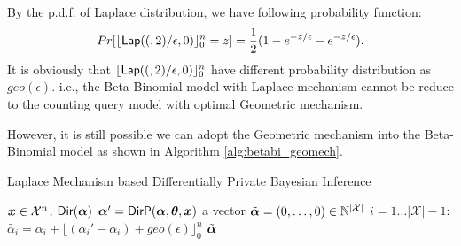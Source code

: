 \documentclass{article}
\begin{document}
By the p.d.f. of Laplace distribution, we have following probability function:
\[
	Pr[\lfloor \mathsf{Lap}((, 2)/\epsilon, 0) \rfloor_0^{n} = z]
	= \frac{1}{2}(1 - e^{-z/\epsilon} - e^{-z/\epsilon}).
\]
It is obviously that $\lfloor \mathsf{Lap}((, 2)/\epsilon, 0) \rfloor_0^{n}$ have different probability distribution as $geo(\epsilon)$.
i.e., the Beta-Binomial model with Laplace mechanism cannot be reduce to the counting query model with optimal Geometric mechanism.

However, it is still possible we can adopt the Geometric mechanism into the Beta-Binomial model as shown in Algorithm \ref{alg:betabi_geomech}.

\begin{algorithm}
  \caption{Laplace Mechanism based Differentially Private Bayesian Inference}
  \label{alg:betabi_geomech}
  \begin{algorithmic}
  \STATE $\boldsymbol{x}\in\mathcal{X}^n$, $\mathsf{Dir}(\boldsymbol{\alpha})$
  \STATE {} $\boldsymbol{\alpha}' = \mathsf{DirP}(\boldsymbol{\alpha},\boldsymbol{\theta},\boldsymbol{x})$
  \STATE {} a vector $\tilde{\boldsymbol{\alpha}} = (0, \dots, 0 )\in \mathbb{N}^{|\mathcal{X}|}$ 
  \STATE {} $i = 1 \dots |\mathcal{X}| - 1$:
  \STATE \quad {} $\tilde{\alpha_i}=\alpha_i + \lfloor{(\alpha_i' - \alpha_i)+ geo(\epsilon) }\rfloor^n_0$
   $\tilde{\boldsymbol{\alpha}}$
  \end{algorithmic}
\end{algorithm}
%
\end{document}
